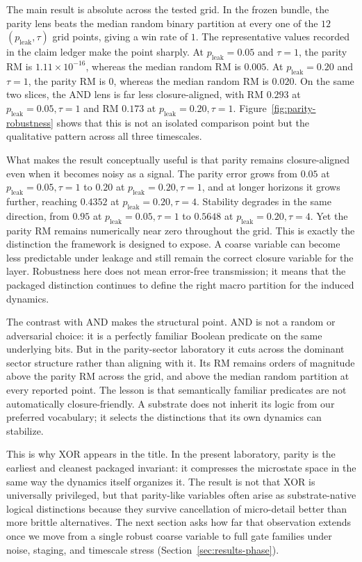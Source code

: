 \documentclass[11pt]{article}
\theoremstyle{definition}
\begin{document}
The main result is absolute across the tested grid. In the frozen bundle, the parity lens beats the median random binary partition at every one of the \(12\) \((p_{\mathrm{leak}},\tau)\) grid points, giving a win rate of \(1\). The representative values recorded in the claim ledger make the point sharply. At \(p_{\mathrm{leak}}=0.05\) and \(\tau=1\), the parity RM is \(1.11\times 10^{-16}\), whereas the median random RM is \(0.005\). At \(p_{\mathrm{leak}}=0.20\) and \(\tau=1\), the parity RM is \(0\), whereas the median random RM is \(0.020\). On the same two slices, the AND lens is far less closure-aligned, with RM \(0.293\) at \(p_{\mathrm{leak}}=0.05,\tau=1\) and RM \(0.173\) at \(p_{\mathrm{leak}}=0.20,\tau=1\). Figure~\ref{fig:parity-robustness} shows that this is not an isolated comparison point but the qualitative pattern across all three timescales.

What makes the result conceptually useful is that parity remains closure-aligned even when it becomes noisy as a signal. The parity error grows from \(0.05\) at \(p_{\mathrm{leak}}=0.05,\tau=1\) to \(0.20\) at \(p_{\mathrm{leak}}=0.20,\tau=1\), and at longer horizons it grows further, reaching \(0.4352\) at \(p_{\mathrm{leak}}=0.20,\tau=4\). Stability degrades in the same direction, from \(0.95\) at \(p_{\mathrm{leak}}=0.05,\tau=1\) to \(0.5648\) at \(p_{\mathrm{leak}}=0.20,\tau=4\). Yet the parity RM remains numerically near zero throughout the grid. This is exactly the distinction the framework is designed to expose. A coarse variable can become less predictable under leakage and still remain the correct closure variable for the layer. Robustness here does not mean error-free transmission; it means that the packaged distinction continues to define the right macro partition for the induced dynamics.

The contrast with AND makes the structural point. AND is not a random or adversarial choice: it is a perfectly familiar Boolean predicate on the same underlying bits. But in the parity-sector laboratory it cuts across the dominant sector structure rather than aligning with it. Its RM remains orders of magnitude above the parity RM across the grid, and above the median random partition at every reported point. The lesson is that semantically familiar predicates are not automatically closure-friendly. A substrate does not inherit its logic from our preferred vocabulary; it selects the distinctions that its own dynamics can stabilize.

This is why XOR appears in the title. In the present laboratory, parity is the earliest and cleanest packaged invariant: it compresses the microstate space in the same way the dynamics itself organizes it. The result is not that XOR is universally privileged, but that parity-like variables often arise as substrate-native logical distinctions because they survive cancellation of micro-detail better than more brittle alternatives. The next section asks how far that observation extends once we move from a single robust coarse variable to full gate families under noise, staging, and timescale stress (Section~\ref{sec:results-phase}).
\end{document}
